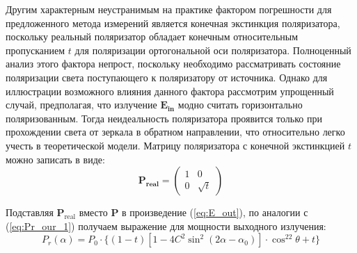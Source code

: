 \documentclass{article}
\begin{document}
Другим характерным неустранимым на практике фактором погрешности для предложенного метода измерений является конечная экстинкция поляризатора, поскольку реальный поляризатор обладает конечным относительным пропусканием $t$ для поляризации ортогональной оси поляризатора. Полноценный анализ этого фактора непрост, поскольку необходимо рассматривать состояние поляризации света поступающего к поляризатору от источника. Однако для иллюстрации возможного влияния данного фактора рассмотрим упрощенный случай, предполагая, что излучение $\bm{E_{in}}$ модно считать горизонтально поляризованным. Тогда неидеальность поляризатора проявится только при прохождении света от зеркала в обратном направлении, что относительно легко учесть в теоретической модели.  Матрицу поляризатора с конечной экстинкцией $t$ можно записать в виде:
\begin{equation}
	\bm{P_{real}} = 
	\begin{pmatrix}
		1 & 0 \\
		0 & \sqrt{t}
	\end{pmatrix}	
\end{equation}

Подставляя $\bm{P}_{\text{real}}$ вместо $\bm{P}$ в произведение (\ref{eq:E_out}), по аналогии с (\ref{eq:Pr_our_1}) получаем выражение для мощности выходного излучения:
\begin{equation}
    P_r(\alpha)=P_0\cdot\{(1-t)\left[1-4C^2\sin^2(2\alpha-\alpha_0)\right]\cdot \cos^22\theta+t \}
\end{equation}
\end{document}
